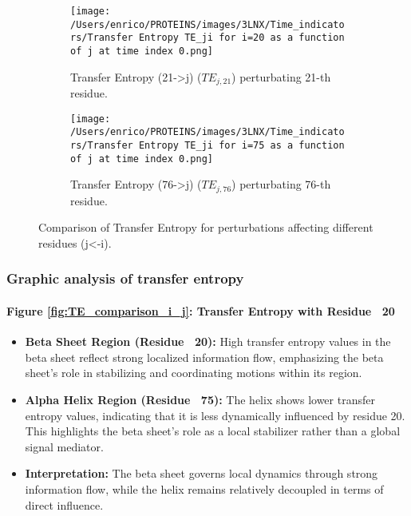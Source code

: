 \documentclass[English, Lau, oneside]{sapthesis}
\begin{document}
\begin{figure}[h!]
    \centering
    \begin{subfigure}[t]{0.48\textwidth}
        \centering
        \texttt{[image: /Users/enrico/PROTEINS/images/3LNX/Time\_indicators/Transfer Entropy TE\_ji for i=20 as a function of j at time index 0.png]}
        \caption{Transfer Entropy (21->j) ($TE_{j,21}$) perturbating 21-th residue.}
        \label{fig:TE21_j_i}
    \end{subfigure}
    \hfill
    \begin{subfigure}[t]{0.48\textwidth}
        \centering
        \texttt{[image: /Users/enrico/PROTEINS/images/3LNX/Time\_indicators/Transfer Entropy TE\_ji for i=75 as a function of j at time index 0.png]}
        \caption{Transfer Entropy (76->j) ($TE_{j,76}$) perturbating 76-th residue.}
        \label{fig:TE76_j_i}
    \end{subfigure}
    \caption{Comparison of Transfer Entropy for perturbations affecting different residues (j<-i).}
    \label{fig:TE_comparison_j_i}
\end{figure}


\subsubsection*{Graphic analysis of transfer entropy}
\paragraph{Figure \ref{fig:TE_comparison_i_j}: Transfer Entropy with Residue ~20}
\begin{itemize}
    \item \textbf{Beta Sheet Region (Residue ~20):} High transfer entropy values in the beta sheet reflect strong localized information flow, emphasizing the beta sheet's role in stabilizing and coordinating motions within its region.
    \item \textbf{Alpha Helix Region (Residue ~75):} The helix shows lower transfer entropy values, indicating that it is less dynamically influenced by residue 20. This highlights the beta sheet's role as a local stabilizer rather than a global signal mediator.
    \item \textbf{Interpretation:} The beta sheet governs local dynamics through strong information flow, while the helix remains relatively decoupled in terms of direct influence.
\end{itemize}
\end{document}
